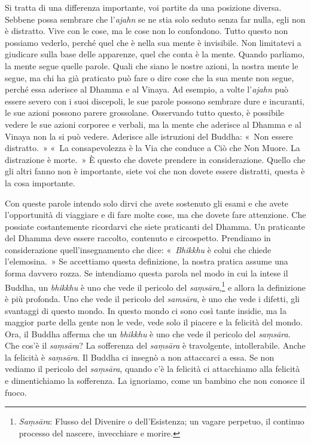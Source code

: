 Si tratta di una differenza importante, voi partite da una posizione
diversa. Sebbene possa sembrare che l'\emph{ajahn} se ne stia solo
seduto senza far nulla, egli non è distratto. Vive con le cose, ma le
cose non lo confondono. Tutto questo non possiamo vederlo, perché quel
che è nella sua mente è invisibile. Non limitatevi a giudicare sulla
base delle apparenze, quel che conta è la mente. Quando parliamo, la
mente segue quelle parole. Quali che siano le nostre azioni, la nostra
mente le segue, ma chi ha già praticato può fare o dire cose che la sua
mente non segue, perché essa aderisce al Dhamma e al Vinaya. Ad esempio,
a volte l'\emph{ajahn} può essere severo con i suoi discepoli, le sue
parole possono sembrare dure e incuranti, le sue azioni possono parere
grossolane. Osservando tutto questo, è possibile vedere le sue azioni
corporee e verbali, ma la mente che aderisce al Dhamma e al Vinaya non
la si può vedere. Aderisce alle istruzioni del Buddha: «~Non essere
distratto.~» «~La consapevolezza è la Via che conduce a Ciò che Non
Muore. La distrazione è morte.~» È questo che dovete prendere in
considerazione. Quello che gli altri fanno non è importante, siete voi
che non dovete essere distratti, questa è la cosa importante.

Con queste parole intendo solo dirvi che avete sostenuto gli esami e che
avete l'opportunità di viaggiare e di fare molte cose, ma che dovete
fare attenzione. Che possiate costantemente ricordarvi che siete
praticanti del Dhamma. Un praticante del Dhamma deve essere raccolto,
contenuto e circospetto. Prendiamo in considerazione quell'insegnamento
che dice: «~\emph{Bhikkhu} è colui che chiede l'elemosina.~» Se
accettiamo questa definizione, la nostra pratica assume una forma
davvero rozza. Se intendiamo questa parola nel modo in cui la intese il
Buddha, un \emph{bhikkhu} è uno che vede il pericolo del
\emph{saṃsāra},\footnote{\emph{Saṃsāra}: Flusso del Divenire o
  dell'Esistenza; un vagare perpetuo, il continuo processo del nascere,
  invecchiare e morire.} e allora la definizione è più profonda. Uno che
vede il pericolo del \emph{samsāra}, è uno che vede i difetti, gli
svantaggi di questo mondo. In questo mondo ci sono così tante insidie,
ma la maggior parte della gente non le vede, vede solo il piacere e la
felicità del mondo. Ora, il Buddha afferma che un \emph{bhikkhu} è uno
che vede il pericolo del \emph{saṃsāra}. Che cos'è il \emph{saṃsāra}? La
sofferenza del \emph{saṃsāra} è travolgente, intollerabile. Anche la
felicità è \emph{saṃsāra}. Il Buddha ci insegnò a non attaccarci a essa.
Se non vediamo il pericolo del \emph{saṃsāra}, quando c'è la felicità ci
attacchiamo alla felicità e dimentichiamo la sofferenza. La ignoriamo,
come un bambino che non conosce il fuoco.

